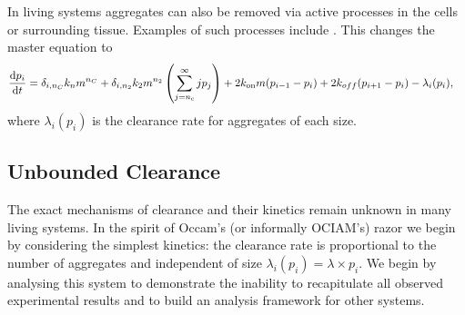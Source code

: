In living systems aggregates can also be removed via active processes in the cells or surrounding tissue. Examples of such processes include . This changes the master equation to
\begin{equation}
\begin{split}
    \frac{\text{d}p_i}{\text{d}t} &= \delta_{i, n_C}k_n m^{n_C} + \delta_{i, n_2} k_2 m^{n_2} \left(\sum_{j=n_{\mathrm{c}}}^{\infty} j p_j\right) + 2k_\text{on} m (p_{i-1}-p_i) + 2k_{off} (p_{i+1}-p_i) - \lambda_i(p_i),
    \end{split}
    \label{eq:4-pi_cleared}
\end{equation}
where $\lambda_i(p_i)$ is the clearance rate for aggregates of each size.

\subsection{Unbounded Clearance}

The exact mechanisms of clearance and their kinetics remain unknown in many living systems. In the spirit of Occam's (or informally OCIAM's) razor we begin by considering the simplest kinetics: the clearance rate is proportional to the number of aggregates and independent of size $\lambda_i(p_i)=\lambda \times p_i$. We begin by analysing this system to demonstrate the inability to recapitulate all observed experimental results and to build an analysis framework for other systems.


